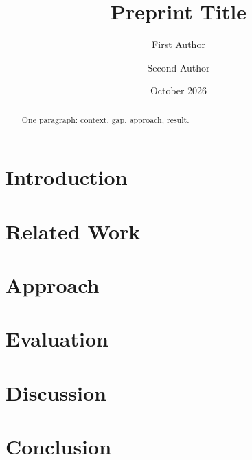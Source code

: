 \documentclass[11pt]{article}
\title{Preprint Title}
\author{First Author \and Second Author}
\date{October 2026}
\begin{document}
\maketitle

\begin{abstract}
One paragraph: context, gap, approach, result.
\end{abstract}

\section{Introduction}
\section{Related Work}
\section{Approach}
\section{Evaluation}
\section{Discussion}
\section{Conclusion}
\end{document}
